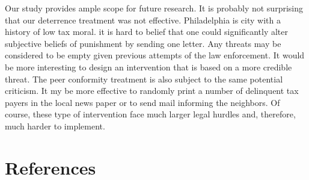 \documentclass[12pt,titlepage]{article}
\begin{document}
Our study provides ample scope for future research.  It is probably not surprising that our deterrence treatment
was not effective. Philadelphia is city with a history of low tax moral. it is hard to belief that one could significantly alter subjective
beliefs of punishment by sending one letter. Any threats may be considered to be empty given previous attempts of 
the law enforcement. It would be more interesting to design an intervention that is based on a more credible threat.
The peer conformity treatment is also subject to the same potential criticism. It my be more effective to randomly print 
a number of delinquent tax payers in the local news paper or to send mail informing the neighbors. Of course, these type of intervention face much larger legal hurdles and, therefore, much harder to implement.




\newpage

\section*{References}
\end{document}
